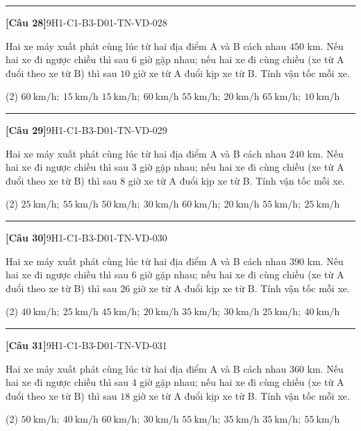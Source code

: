 \documentclass[12pt,a4paper]{article}
\newif\ifloigiai
\newenvironment{cauhoi}[2]{%
  \par\medskip\noindent\rule{\textwidth}{0.4pt}\par\nopagebreak
  \noindent\textbf{[#1]}\hfill{\scriptsize\ttfamily #2}\par\nopagebreak\smallskip}{\par}
\newcommand{\dapan}[1]{\ifloigiai\par\smallskip\noindent\textit{Đáp án:} \textbf{#1}\par\fi}
\begin{document}
\begin{cauhoi}{Câu 28}{9H1-C1-B3-D01-TN-VD-028}
Hai xe máy xuất phát cùng lúc từ hai địa điểm A và B cách nhau $450$ km. Nếu hai xe đi ngược chiều thì sau $6$ giờ gặp nhau; nếu hai xe đi cùng chiều (xe từ A đuổi theo xe từ B) thì sau $10$ giờ xe từ A đuổi kịp xe từ B. Tính vận tốc mỗi xe.
\begin{tasks}(2)
\task $60\ \text{km/h};\ 15\ \text{km/h}$
\task $15\ \text{km/h};\ 60\ \text{km/h}$
\task $55\ \text{km/h};\ 20\ \text{km/h}$
\task $65\ \text{km/h};\ 10\ \text{km/h}$
\end{tasks}
\dapan{A}
\end{cauhoi}
\begin{cauhoi}{Câu 29}{9H1-C1-B3-D01-TN-VD-029}
Hai xe máy xuất phát cùng lúc từ hai địa điểm A và B cách nhau $240$ km. Nếu hai xe đi ngược chiều thì sau $3$ giờ gặp nhau; nếu hai xe đi cùng chiều (xe từ A đuổi theo xe từ B) thì sau $8$ giờ xe từ A đuổi kịp xe từ B. Tính vận tốc mỗi xe.
\begin{tasks}(2)
\task $25\ \text{km/h};\ 55\ \text{km/h}$
\task $50\ \text{km/h};\ 30\ \text{km/h}$
\task $60\ \text{km/h};\ 20\ \text{km/h}$
\task $55\ \text{km/h};\ 25\ \text{km/h}$
\end{tasks}
\dapan{D}
\end{cauhoi}
\begin{cauhoi}{Câu 30}{9H1-C1-B3-D01-TN-VD-030}
Hai xe máy xuất phát cùng lúc từ hai địa điểm A và B cách nhau $390$ km. Nếu hai xe đi ngược chiều thì sau $6$ giờ gặp nhau; nếu hai xe đi cùng chiều (xe từ A đuổi theo xe từ B) thì sau $26$ giờ xe từ A đuổi kịp xe từ B. Tính vận tốc mỗi xe.
\begin{tasks}(2)
\task $40\ \text{km/h};\ 25\ \text{km/h}$
\task $45\ \text{km/h};\ 20\ \text{km/h}$
\task $35\ \text{km/h};\ 30\ \text{km/h}$
\task $25\ \text{km/h};\ 40\ \text{km/h}$
\end{tasks}
\dapan{A}
\end{cauhoi}
\begin{cauhoi}{Câu 31}{9H1-C1-B3-D01-TN-VD-031}
Hai xe máy xuất phát cùng lúc từ hai địa điểm A và B cách nhau $360$ km. Nếu hai xe đi ngược chiều thì sau $4$ giờ gặp nhau; nếu hai xe đi cùng chiều (xe từ A đuổi theo xe từ B) thì sau $18$ giờ xe từ A đuổi kịp xe từ B. Tính vận tốc mỗi xe.
\begin{tasks}(2)
\task $50\ \text{km/h};\ 40\ \text{km/h}$
\task $60\ \text{km/h};\ 30\ \text{km/h}$
\task $55\ \text{km/h};\ 35\ \text{km/h}$
\task $35\ \text{km/h};\ 55\ \text{km/h}$
\end{tasks}
\dapan{C}
\end{cauhoi}
\end{document}
